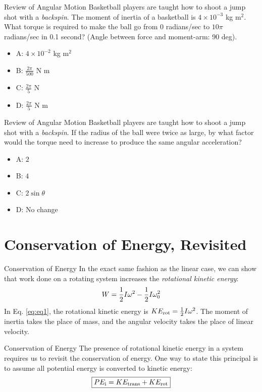 \documentclass{beamer}
\begin{document}
\begin{frame}{Review of Angular Motion}
Basketball players are taught how to shoot a jump shot with a \textit{backspin}.  The moment of inertia of a basketball is $4\times 10^{-3}$ kg m$^2$.  What torque is required to make the ball go from 0 radians/sec to $10\pi$ radians/sec in 0.1 second? (Angle between force and moment-arm: 90 deg).
\begin{itemize}
\item A: $4\times 10^{-2}$ kg m$^2$
\item B: $\frac{2\pi}{500}$ N m
\item C: $\frac{2\pi}{5}$ N
\item D: $\frac{2\pi}{5}$ N m
\end{itemize}
\end{frame}

\begin{frame}{Review of Angular Motion}
Basketball players are taught how to shoot a jump shot with a \textit{backspin}.  If the radius of the ball were twice as large, by what factor would the torque need to increase to produce the same angular acceleration?
\begin{itemize}
\item A: $2$
\item B: $4$
\item C: $2\sin\theta$
\item D: No change
\end{itemize}
\end{frame}

\section{Conservation of Energy, Revisited}

\begin{frame}{Conservation of Energy}
In the exact same fashion as the linear case, we can show that work done on a rotating system increases the \textit{rotational kinetic energy}:
\begin{equation}
W = \frac{1}{2}I\omega^2 - \frac{1}{2}I\omega_{\rm 0}^2 \label{eq:eq1}
\end{equation}
In Eq. \ref{eq:eq1}, the rotational kinetic energy is $KE_{\rm rot} = \frac{1}{2}I\omega^2$.  The moment of inertia takes the place of mass, and the angular velocity takes the place of linear velocity.
\end{frame}

\begin{frame}{Conservation of Energy}
The presence of rotational kinetic energy in a system requires us to revisit the conservation of energy.  One way to state this principal is to assume all potential energy is converted to kinetic energy: 
\begin{equation}
\boxed{PE_{\rm i} = KE_{\rm trans} + KE_{\rm rot}}
\end{equation}
\end{frame}
\end{document}
